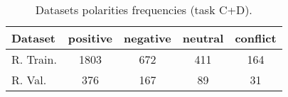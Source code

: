 \documentclass[11pt,a4paper]{article}
\begin{document}
	\begin{table}[H]
		\centering
		\begin{tabular}{@{}lcccc@{}}
			\toprule
			\textbf{Dataset} & positive & negative & neutral & conflict \\ \midrule
			R. Train.        & 1803     & 672      & 411     & 164      \\
			R. Val.          & 376      & 167      & 89      & 31       \\ \bottomrule
		\end{tabular}
		\caption{Datasets polarities frequencies (task C+D).}
		\label{tab:targets}
	\end{table}
	
	
	
	
	
	
	
\end{document}
